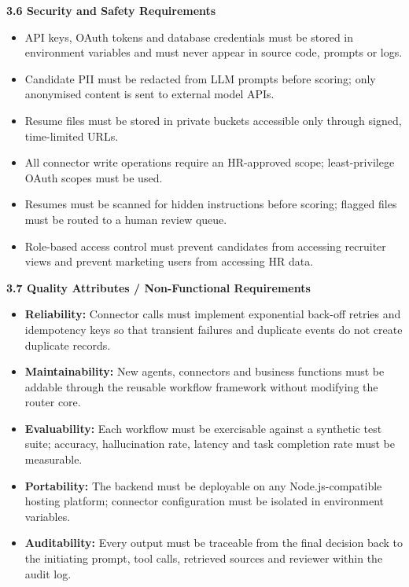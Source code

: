 \vspace{10pt}
\noindent\textbf{3.6 Security and Safety Requirements}
\begin{itemize}
  \item API keys, OAuth tokens and database credentials must be stored in environment variables and must never appear in source code, prompts or logs.
  \item Candidate PII must be redacted from LLM prompts before scoring; only anonymised content is sent to external model APIs.
  \item Resume files must be stored in private buckets accessible only through signed, time-limited URLs.
  \item All connector write operations require an HR-approved scope; least-privilege OAuth scopes must be used.
  \item Resumes must be scanned for hidden instructions before scoring; flagged files must be routed to a human review queue.
  \item Role-based access control must prevent candidates from accessing recruiter views and prevent marketing users from accessing HR data.
\end{itemize}

\vspace{10pt}
\noindent\textbf{3.7 Quality Attributes / Non-Functional Requirements}
\begin{itemize}
  \item \textbf{Reliability:} Connector calls must implement exponential back-off retries and idempotency keys so that transient failures and duplicate events do not create duplicate records.
  \item \textbf{Maintainability:} New agents, connectors and business functions must be addable through the reusable workflow framework without modifying the router core.
  \item \textbf{Evaluability:} Each workflow must be exercisable against a synthetic test suite; accuracy, hallucination rate, latency and task completion rate must be measurable.
  \item \textbf{Portability:} The backend must be deployable on any Node.js-compatible hosting platform; connector configuration must be isolated in environment variables.
  \item \textbf{Auditability:} Every output must be traceable from the final decision back to the initiating prompt, tool calls, retrieved sources and reviewer within the audit log.
\end{itemize}

